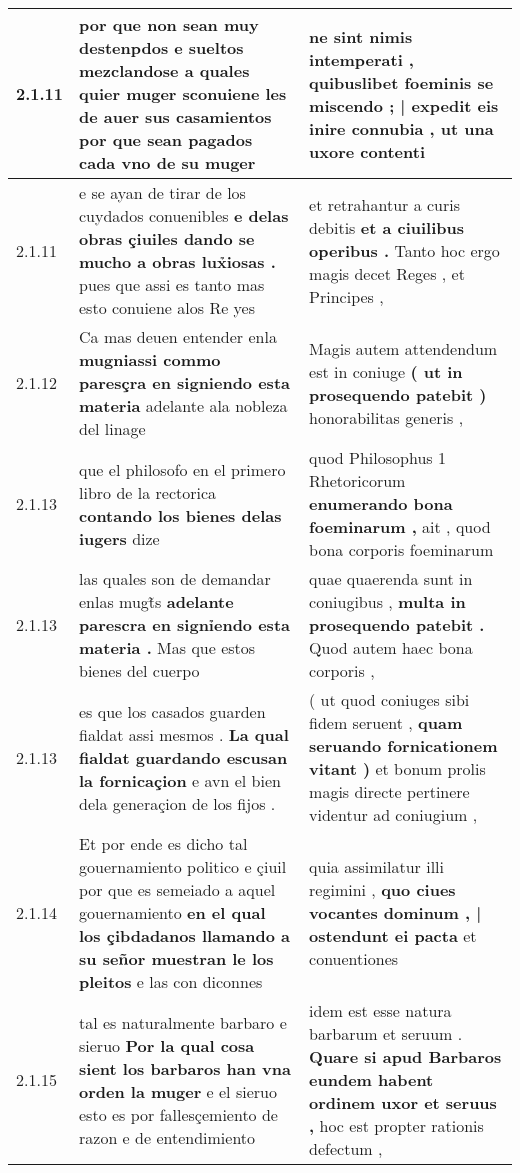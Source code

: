 \begin{tabular}{|p{1cm}|p{6.5cm}|p{6.5cm}|}
2.1.11 & por que non sean muy destenpdos e sueltos \textbf{ mezclandose a quales quier muger sconuiene les de auer sus casamientos } por que sean pagados cada vno de su muger & ne sint nimis intemperati , \textbf{ quibuslibet foeminis se miscendo ; | expedit eis inire connubia , } ut una uxore contenti \\\hline
2.1.11 & e se ayan de tirar de los cuydados conuenibles \textbf{ e delas obras çiuiles dando se mucho a obras lux̉iosas . } pues que assi es tanto mas esto conuiene alos Re yes & et retrahantur a curis debitis \textbf{ et a ciuilibus operibus . } Tanto hoc ergo magis decet Reges , et Principes , \\\hline
2.1.12 & Ca mas deuen entender enla \textbf{ mugniassi commo paresçra en signiendo esta materia } adelante ala nobleza del linage & Magis autem attendendum est in coniuge \textbf{ ( ut in prosequendo patebit ) } honorabilitas generis , \\\hline
2.1.13 & que el philosofo en el primero libro de la rectorica \textbf{ contando los bienes delas iugers } dize & quod Philosophus 1 Rhetoricorum \textbf{ enumerando bona foeminarum , } ait , quod bona corporis foeminarum \\\hline
2.1.13 & las quales son de demandar enlas mugt̃s \textbf{ adelante parescra en signỉendo esta materia . } Mas que estos bienes del cuerpo & quae quaerenda sunt in coniugibus , \textbf{ multa in prosequendo patebit . } Quod autem haec bona corporis , \\\hline
2.1.13 & es que los casados guarden fialdat assi mesmos . \textbf{ La qual fialdat guardando escusan la fornicaçion } e avn el bien dela generaçion de los fijos . & ( ut quod coniuges sibi fidem seruent , \textbf{ quam seruando fornicationem vitant ) } et bonum prolis magis directe pertinere videntur ad coniugium , \\\hline
2.1.14 & Et por ende es dicho tal gouernamiento politico e çiuil por que es semeiado a aquel gouernamiento \textbf{ en el qual los çibdadanos llamando a su señor muestran le los pleitos } e las con diconnes & quia assimilatur illi regimini , \textbf{ quo ciues vocantes dominum , | ostendunt ei pacta } et conuentiones \\\hline
2.1.15 & tal es naturalmente barbaro e sieruo \textbf{ Por la qual cosa sient los barbaros han vna orden la muger } e el sieruo esto es por fallesçemiento de razon e de entendimiento & idem est esse natura barbarum et seruum . \textbf{ Quare si apud Barbaros eundem habent ordinem uxor et seruus , } hoc est propter rationis defectum , \\\hline

\end{tabular}
